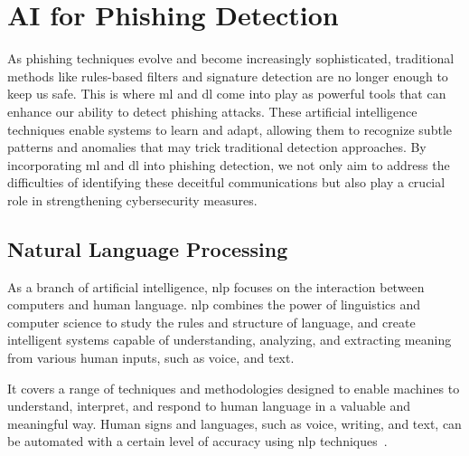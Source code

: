 
\section{AI for Phishing Detection}


As phishing techniques evolve and become increasingly sophisticated, traditional methods like rules-based filters and signature detection are no longer enough to keep us safe. This is where \ac{ml} and \ac{dl} come into play as powerful tools that can enhance our ability to detect phishing attacks. These artificial intelligence techniques enable systems to learn and adapt, allowing them to recognize subtle patterns and anomalies that may trick traditional detection approaches.
By incorporating \ac{ml} and \ac{dl} into phishing detection, we not only aim to address the difficulties of identifying these deceitful communications but also play a crucial role in strengthening cybersecurity measures.

\subsection{Natural Language Processing}



As a branch of artificial intelligence, \ac{nlp} focuses on the interaction between computers and human language. \ac{nlp} combines the power of linguistics and computer science to study the rules and structure of language, and create intelligent systems capable of understanding, analyzing, and extracting meaning from various human inputs, such as voice, and text.

It covers a range of techniques and methodologies designed to enable machines to understand, interpret, and respond to human language in a valuable and meaningful way. Human signs and languages, such as voice, writing, and text, can be automated with a certain level of accuracy using \ac{nlp} techniques~\cite{Sathish20231612}.


